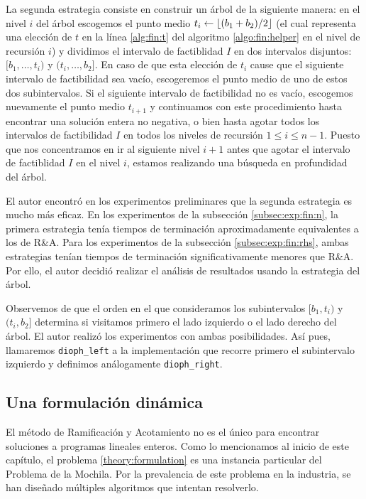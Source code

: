 La segunda estrategia consiste en construir un árbol de la siguiente manera: en el nivel $i$ del
árbol escogemos el punto medio $t_i \leftarrow \left\lfloor (b_1 + b_2)/2 \right\rfloor$ (el cual representa una
elección de $t$ en la línea \ref{alg:fin:t} del algoritmo \ref{algo:fin:helper} en el nivel de
recursión $i$) y dividimos el intervalo de factiblidad $I$ en dos intervalos disjuntos: $[b_1,
\ldots, t_i)$ y $(t_i, \ldots, b_2]$. En caso de que esta elección de $t_i$ cause que el siguiente
intervalo de factibilidad sea vacío, escogeremos el punto medio de uno de estos dos subintervalos.
Si el siguiente intervalo de factibilidad no es vacío, escogemos nuevamente el punto medio $t_{i +
1}$ y continuamos con este procedimiento hasta encontrar una solución entera no negativa, o bien
hasta agotar todos los intervalos de factibilidad $I$ en todos los niveles de recursión $1 \leq i
\leq n - 1$. Puesto que nos concentramos en ir al siguiente nivel $i + 1$ antes que agotar el
intervalo de factiblidad $I$ en el nivel $i$, estamos realizando una búsqueda en profundidad del
árbol.

El autor encontró en los experimentos preliminares que la segunda estrategia es mucho más eficaz. En
los experimentos de la subsección \ref{subsec:exp:fin:n}, la primera estrategia tenía tiempos de
terminación aproximadamente equivalentes a los de R\&A. Para los experimentos
de la subsección \ref{subsec:exp:fin:rhs}, ambas estrategias tenían tiempos de terminación
significativamente menores que R\&A. Por ello, el autor decidió realizar el
análisis de resultados usando la estrategia del árbol.

Observemos de  que el orden en el que consideramos los subintervalos $[b_1, t_i)$ y $(t_i, b_2]$
determina si visitamos primero el lado izquierdo o el lado derecho del árbol. El autor
realizó los experimentos con ambas posibilidades. Así pues, llamaremos \texttt{dioph\_left} a la
implementación que recorre primero el subintervalo izquierdo y definimos análogamente \texttt{dioph\_right}.

\subsection{Una formulación dinámica}
\label{subsec:fin:dp}
\noindent
El método de Ramificación y Acotamiento no es el único para encontrar
soluciones a programas lineales enteros. Como lo mencionamos al inicio de este capítulo, el problema
\eqref{theory:formulation} es una instancia particular del Problema de la Mochila. Por la
prevalencia de este problema en la industria, se han diseñado múltiples algoritmos que
intentan resolverlo.

